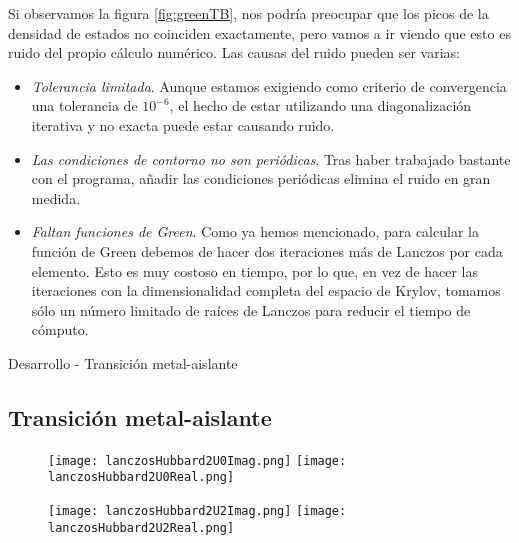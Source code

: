 \documentclass{beamer}
\begin{document}
\begin{frame}
    Si observamos la figura \ref{fig:greenTB}, nos podría preocupar que los picos de la densidad de estados no coinciden exactamente, pero vamos a ir viendo que esto es ruido del propio cálculo numérico. Las causas del ruido pueden ser varias:
    \begin{itemize}
        \item \textit{Tolerancia limitada}. Aunque estamos exigiendo como criterio de convergencia una tolerancia de $10^{-6}$, el hecho de estar utilizando una diagonalización iterativa y no exacta puede estar causando ruido.
        \item \textit{Las condiciones de contorno no son periódicas}. Tras haber trabajado bastante con el programa, añadir las condiciones periódicas elimina el ruido en gran medida.
        \item \textit{Faltan funciones de Green}. Como ya hemos mencionado, para calcular la función de Green debemos de hacer dos iteraciones más de Lanczos por cada elemento. Esto es muy costoso en tiempo, por lo que, en vez de hacer las iteraciones con la dimensionalidad completa del espacio de Krylov, tomamos sólo un número limitado de raíces de Lanczos para reducir el tiempo de cómputo.
    \end{itemize}
\end{frame}
\begin{frame}{Desarrollo - Transición metal-aislante}
    \subsection{Transición metal-aislante}
    \begin{figure}
        \begin{center}
            \texttt{[image: lanczosHubbard2U0Imag.png]}
            \texttt{[image: lanczosHubbard2U0Real.png]}
        \end{center}
    \end{figure}
\end{frame}
\begin{frame}
    \begin{figure}
        \begin{center}
            \texttt{[image: lanczosHubbard2U2Imag.png]}
            \texttt{[image: lanczosHubbard2U2Real.png]}
        \end{center}
    \end{figure}
\end{frame}
\end{document}
